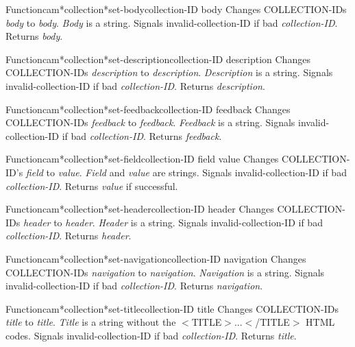 \begin{functiondoc}{Function}{cam*collection*set-body}{collection-ID body}
Changes COLLECTION-IDs {\em body} to {\em body}.
{\em Body} is a string.
Signals invalid-collection-ID if bad {\em collection-ID}.
Returns {\em body}.
\end{functiondoc}

\begin{functiondoc}{Function}{cam*collection*set-description}{collection-ID description}
Changes COLLECTION-IDs {\em description} to {\em description}.
{\em Description} is a string.
Signals invalid-collection-ID if bad {\em collection-ID}.
Returns {\em description}.
\end{functiondoc}

\begin{functiondoc}{Function}{cam*collection*set-feedback}{collection-ID feedback}
Changes COLLECTION-IDs {\em feedback} to {\em feedback}.
{\em Feedback} is a string.
Signals invalid-collection-ID if bad {\em collection-ID}.
Returns {\em feedback}.
\end{functiondoc}

\begin{functiondoc}{Function}{cam*collection*set-field}{collection-ID field value}
Changes COLLECTION-ID's {\em field} to {\em value}.
{\em Field} and {\em value} are strings.
Signals invalid-collection-ID if bad {\em collection-ID}.
Returns {\em value} if successful.
\end{functiondoc}

\begin{functiondoc}{Function}{cam*collection*set-header}{collection-ID header}
Changes COLLECTION-IDs {\em header} to {\em header}.
{\em Header} is a string.
Signals invalid-collection-ID if bad {\em collection-ID}.
Returns {\em header}.
\end{functiondoc}

\begin{functiondoc}{Function}{cam*collection*set-navigation}{collection-ID navigation}
Changes COLLECTION-IDs {\em navigation} to {\em navigation}.
{\em Navigation} is a string.
Signals invalid-collection-ID if bad {\em collection-ID}.
Returns {\em navigation}.
\end{functiondoc}

\begin{functiondoc}{Function}{cam*collection*set-title}{collection-ID title}
Changes COLLECTION-IDs {\em title} to {\em title}.
{\em Title} is a string without the $<$TITLE$>$...$<$/TITLE$>$ HTML codes.
Signals invalid-collection-ID if bad {\em collection-ID}.
Returns {\em title}.
\end{functiondoc}

